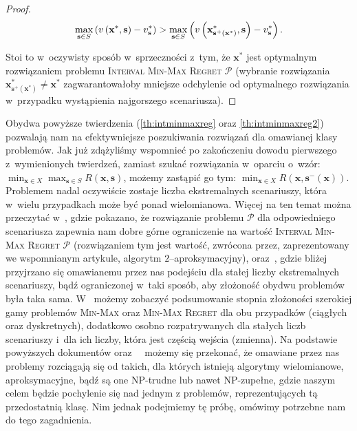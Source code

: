 \begin{proof}
	\begin{equation*}
			\max_{\mathclap{\textbf{s} \in S}} \left( v \left( \textbf{x}^{\ast}, \textbf{s} \right) - v^{\ast}_{\textbf{s}} \right) > \max_{\mathclap{\textbf{s} \in S}} \left( v \left( \textbf{x}^{\ast}_{\textbf{s}^{+} \left( \textbf{x}^{\ast} \right)}, \textbf{s} \right) - v^{\ast}_{\textbf{s}} \right)\text{.}
	\end{equation*}
	
	Stoi to w~oczywisty sposób w~sprzeczności z~tym, że $\textbf{x}^{\ast}$ jest optymalnym rozwiązaniem problemu \textsc{Interval Min-Max Regret $\mathcal{P}$} (wybranie rozwiązania $\textbf{x}^{\ast}_{\textbf{s}^{+} \left( \textbf{x}^{\ast} \right)} \neq \textbf{x}^{\ast}$ zagwarantowałoby mniejsze odchylenie od optymalnego rozwiązania w~przypadku wystąpienia najgorszego scenariusza).
\end{proof}

Obydwa powyższe twierdzenia (\ref{th:intminmaxreg} oraz \ref{th:intminmaxreg2}) pozwalają nam na efektywniejsze poszukiwania rozwiązań dla omawianej klasy problemów.
Jak już zdążyliśmy wspomnieć po zakończeniu dowodu pierwszego z~wymienionych twierdzeń, zamiast szukać rozwiązania w~oparciu o~wzór: $\min_{\textbf{x} \in X} \max_{\textbf{s} \in S} R \left( \textbf{x}, \textbf{s} \right)$, możemy zastąpić go tym: $\min_{\textbf{x} \in X} R \left( \textbf{x}, \textbf{s}^{-} \left( \textbf{x} \right) \right)$.
Problemem nadal oczywiście zostaje liczba ekstremalnych scenariuszy, która w~wielu przypadkach może być ponad wielomianowa.
Więcej na ten temat można przeczytać w~\cite{intervalregMST}, gdzie pokazano, że rozwiązanie problemu $\mathcal{P}$ dla odpowiedniego scenariusza zapewnia nam dobre górne ograniczenie na wartość \textsc{Interval Min-Max Regret $\mathcal{P}$} (rozwiązaniem tym jest wartość, zwrócona przez, zaprezentowany we wspomnianym artykule, algorytm $2$--aproksymacyjny), oraz~\cite{intervalregMST2}, gdzie bliżej przyjrzano się omawianemu przez nas podejściu dla stałej liczby ekstremalnych scenariuszy, bądź ograniczonej w~taki sposób, aby złożoność obydwu problemów była taka sama.
W~\cite{DBLP:journals/ol/KasperskiZ15} możemy zobaczyć podsumowanie stopnia złożoności szerokiej gamy problemów \textsc{Min-Max} oraz \textsc{Min-Max Regret} dla obu przypadków (ciągłych oraz dyskretnych), dodatkowo osobno rozpatrywanych dla stałych liczb scenariuszy i~dla ich liczby, która jest częścią wejścia (zmienna).
Na podstawie powyższych dokumentów oraz~\cite{minmaxApprox}~\cite{intervalregMST2} możemy się przekonać, że omawiane przez nas problemy rozciągają się od takich, dla których istnieją algorytmy wielomianowe, aproksymacyjne, bądź są one \textsc{NP}-trudne lub nawet \textsc{NP}-zupełne, gdzie naszym celem będzie pochylenie się nad jednym z problemów, reprezentujących tą przedostatnią klasę. 
Nim jednak podejmiemy tę próbę, omówimy potrzebne nam do tego zagadnienia.




